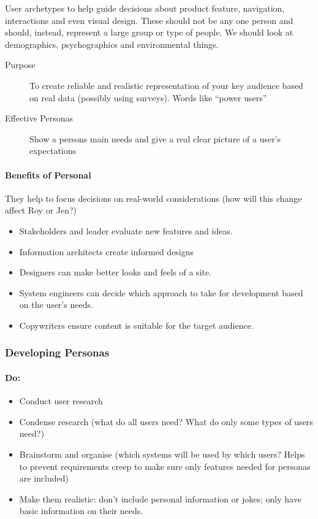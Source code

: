 User archetypes to help guide decisions about product feature, navigation, interactions and even visual design.
These should not be any one person and should, instead, represent a large group or type of people.
We should look at demographics, psychographics and environmental things.

\begin{description}
	\item[Purpose] To create reliable and realistic representation of your key audience based on real data (possibly using surveys).
        Words like ``power users''
	\item[Effective Personas] Show a persons main needs and give a real clear picture of a user's expectations
\end{description}

\paragraph{Benefits of Personal}\label{par:benefits_of_personal}

They help to focus decisions on real-world considerations (how will this change affect Roy or Jen?)

\begin{itemize}
	\item Stakeholders and leader evaluate new features and ideas.
	\item Information architects create informed designs
	\item Designers can make better looks and feels of a site.
	\item System engineers can decide which approach to take for development based on the user's needs.
	\item Copywriters ensure content is suitable for the target audience.
\end{itemize}

\subsubsection{Developing Personas}\label{ssub:developing_personas}

\paragraph{Do:}\label{par:do_}

\begin{itemize}
	\item Conduct user research
	\item Condense research (what do all users need? What do only some types of users need?)
	\item Brainstorm and organise (which systems will be used by which users? Helps to prevent requirements creep to make sure only features needed for personas are included)
	\item Make them realistic: don't include personal information or jokes; only have basic information on their needs.
\end{itemize}


